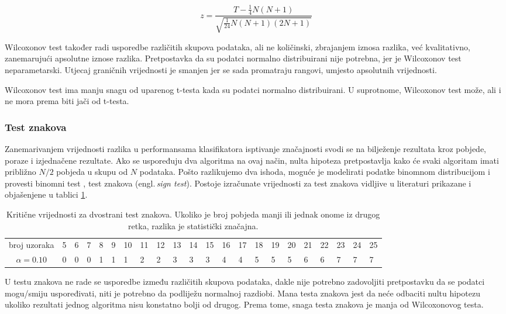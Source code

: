 $$z = \frac{T - \frac{1}{4}N(N+1)}{\sqrt{\frac{1}{24}N(N+1)(2N+1)}}$$

Wilcoxonov test također radi usporedbe različitih skupova podataka, ali ne količinski, zbrajanjem iznosa razlika, već kvalitativno, zanemarujući apsolutne iznose razlika. Pretpostavka da su podatci normalno distribuirani nije potrebna, jer je Wilcoxonov test neparametarski. Utjecaj graničnih vrijednosti je smanjen jer se sada promatraju rangovi, umjesto apsolutnih vrijednosti. 

Wilcoxonov test ima manju snagu od uparenog t-testa kada su podatci normalno distribuirani. U suprotnome, Wilcoxonov test može, ali i ne mora prema \citep{demvsar2006statistical} biti jači od t-testa.

\subsubsection{Test znakova}

Zanemarivanjem vrijednosti razlika u performansama klasifikatora isptivanje značajnosti svodi se na bilježenje rezultata kroz pobjede, poraze i izjednačene rezultate. Ako se uspoređuju dva algoritma na ovaj način, nulta hipoteza pretpostavlja kako će svaki algoritam imati približno $N/2$ pobjeda u skupu od $N$ podataka. Pošto razlikujemo dva ishoda, moguće je modelirati podatke binomnom distribucijom \citep{miller1965probability} i provesti binomni test \citep{dixon1946statistical}, test znakova (engl.\,\textit{sign test}). Postoje izračunate vrijednosti za test znakova vidljive u literaturi \citep{wilcoxon1973critical} prikazane i objašenjene u tablici \ref{tab:crit_val_twotailed_sign}.

\begin{table}
\begin{tabularx}{\textwidth}{c| XXXXXXXXXXXXXXXXXXXXX}
\hline
broj uzoraka & 5&6&7&8&9&10&11&12 & 13&14&15&16&17&18&19&20&21&22&23&24&25 \\
$\alpha = 0.10$ & 0&0&0&1&1&1&2&2&3&3&3&4&4&5&5&5&6&6&7&7&7 \\
\hline
\end{tabularx}
\caption{Kritične vrijednosti za dvostrani test znakova. Ukoliko je broj pobjeda manji ili jednak onome iz drugog retka, razlika je statistički značajna.}
\label{tab:crit_val_twotailed_sign}
\end{table}

U testu znakova ne rade se usporedbe između različitih skupova podataka, dakle nije potrebno zadovoljiti pretpostavku da se podatci mogu/smiju uspoređivati, niti je potrebno da podliježu normalnoj razdiobi. Mana testa znakova jest da neće odbaciti nultu hipotezu ukoliko rezultati jednog algoritma nisu konstatno bolji od drugog. Prema tome, snaga testa znakova je manja od Wilcoxonovog testa.


